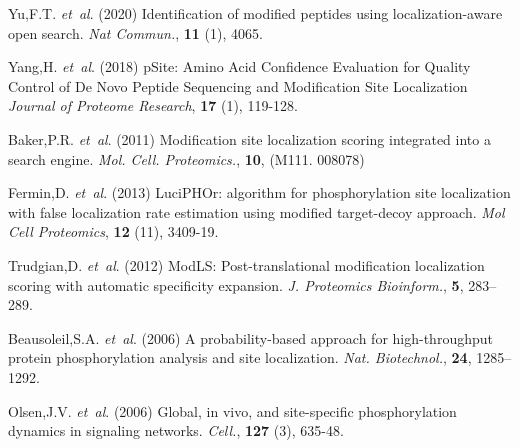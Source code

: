 \documentclass{bioinfo}
\begin{document}
\begin{thebibliography}{}

Yu,F.T. {\it et~al}. (2020) Identification of modified peptides using localization-aware open search. {\it Nat Commun.}, {\bf 11} (1), 4065.

Yang,H. {\it et~al}. (2018) pSite: Amino Acid Confidence Evaluation for Quality Control of De Novo Peptide Sequencing and Modification Site Localization {\it Journal of Proteome Research}, {\bf 17} (1), 119-128.

Baker,P.R. {\it et~al}. (2011) Modification site localization scoring integrated into a search engine.
{\it Mol. Cell. Proteomics.}, {\bf 10}, (M111. 008078)

Fermin,D. {\it et~al}. (2013) LuciPHOr: algorithm for phosphorylation site localization with false localization rate estimation using modified target-decoy approach. {\it Mol Cell Proteomics}, {\bf 12} (11), 3409-19.

Trudgian,D. {\it et~al}. (2012) ModLS: Post-translational modification localization scoring with automatic specificity expansion. {\it J. Proteomics Bioinform.}, {\bf 5}, 283–289.

Beausoleil,S.A. {\it et~al}. (2006) A probability-based approach for high-throughput protein phosphorylation analysis and site localization. {\it Nat. Biotechnol.}, {\bf 24}, 1285–1292.

Olsen,J.V. {\it et~al}. (2006) Global, in vivo, and site-specific phosphorylation dynamics in signaling networks. {\it Cell.}, {\bf 127} (3), 635-48.




\end{thebibliography}
\end{document}
